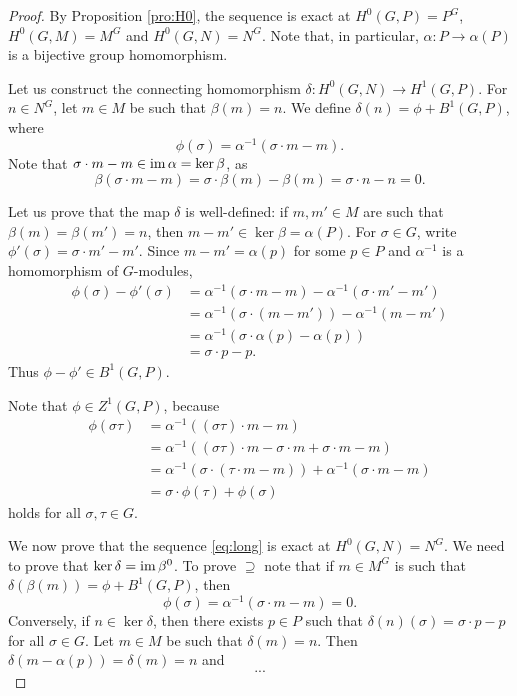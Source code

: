 \begin{proof}
    By Proposition \ref{pro:H0}, the 
    sequence is exact at $H^0(G,P)=P^G$, 
    $H^0(G,M)=M^G$ and 
    $H^0(G,N)=N^G$. Note that, in particular, 
    $\alpha\colon P\to\alpha(P)$ is a bijective group homomorphism. 


    Let us construct the connecting
    homomorphism $\delta\colon H^0(G,N)\to H^1(G,P)$. For 
    $n\in N^G$, let $m\in M$ be such that 
    $\beta(m)=n$. We define $\delta(n)=\phi+B^1(G,P)$, where 
    \[
    \phi(\sigma)=\alpha^{-1}(\sigma\cdot m-m).
    \]
    Note that $\sigma\cdot m-m\in\operatorname{im}\alpha=\ker\beta$, as 
    \[
    \beta(\sigma\cdot m-m)=\sigma\cdot \beta(m)-\beta(m)=\sigma\cdot n-n=0.
    \]

    Let us prove that the map $\delta$ is well-defined: if $m,m'\in M$ are such that
    $\beta(m)=\beta(m')=n$, then  $m-m'\in\ker\beta=\alpha(P)$. 
    For $\sigma\in G$, write $\phi'(\sigma)=\sigma\cdot m'-m'$. 
    Since  
    $m-m'=\alpha(p)$ for some $p\in P$ and  
    $\alpha^{-1}$ is a homomorphism of $G$-modules, 
    \begin{align*}
    \phi(\sigma)-\phi'(\sigma)&=\alpha^{-1}(\sigma\cdot m-m)
    -\alpha^{-1}(\sigma\cdot m'-m')\\
    &=\alpha^{-1}(\sigma\cdot (m-m'))-\alpha^{-1}(m-m')\\
    &=\alpha^{-1}(\sigma\cdot\alpha(p)-\alpha(p))\\
    &=\sigma\cdot p-p.
    \end{align*}
    Thus $\phi-\phi'\in B^1(G,P)$. 

    Note that $\phi\in Z^1(G,P)$, because
    \begin{align*}
    \phi(\sigma\tau)&=\alpha^{-1}((\sigma\tau)\cdot m-m)\\
    &=\alpha^{-1}((\sigma\tau)\cdot m-\sigma\cdot m+\sigma\cdot m-m)\\
    &=\alpha^{-1}(\sigma\cdot (\tau\cdot m-m))+\alpha^{-1}(\sigma\cdot m-m)\\
    &=\sigma\cdot\phi(\tau)+\phi(\sigma)
    \end{align*}
    holds for all $\sigma,\tau\in G$. 
    
    We now prove that the sequence \eqref{eq:long}
    is exact at $H^0(G,N)=N^G$. We need to prove that $\ker\delta=\operatorname{im}\beta^0$. To prove $\supseteq$ note that if $m\in M^G$ is such that 
    $\delta(\beta(m))=\phi+B^1(G,P)$, then 
    \[
    \phi(\sigma)=\alpha^{-1}(\sigma\cdot m-m)=0.
    \]
    Conversely, if $n\in\ker\delta$, then 
    there exists $p\in P$ such that 
    $\delta(n)(\sigma)=\sigma\cdot p-p$ for all $\sigma\in G$. Let $m\in M$ be such that $\delta(m)=n$. 
    Then $\delta(m-\alpha(p))=\delta(m)=n$ and 
    \[
    ...
    \]


\end{proof}
